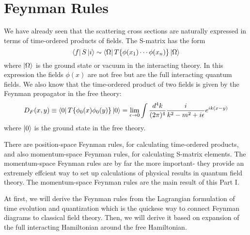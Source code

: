 \documentclass[12pt,openany]{book}
\begin{document}
	
	
	
	
	
	
	
	
	
	
	
	
	
	
	
	
	
	
	
	
	
	
	
	
	
	
	
	\chapter{Feynman Rules}
     We have already seen that the scattering cross sections are naturally expressed
     in terms of time-ordered products of fields. The S-matrix has the form
     \begin{equation}
     	\bra{f}S\ket{i}\sim \bra{\Omega}T\{\phi(x_1)\cdots\phi(x_n)\}\ket{\Omega}
     \end{equation}
     where $\ket{\Omega}$ is the ground state or vacuum in the interacting theory. 
     In this expression the fields $\phi(x)$ are not free but are the full interacting
     quantum fields. We also know that the time-ordered product of two fields is given by 
     the Feynman propagator in the free theory:
     \begin{equation}
     	D_F(x,y)\equiv\bra{0}T\{\phi_0(x)\phi_0(y)\}\ket{0}=\lim_{\epsilon\rightarrow0}\int\frac{d^4k}{(2\pi)^4}\frac{i}{k^2-m^2+i\epsilon}e^{ik(x-y)}
     \end{equation}
     where $\ket{0}$ is the ground state in the free theory.
     \par
     There are position-space Feynman rules, for calculating time-ordered products,
     and also momentum-space Feynman rules, for calculating S-matrix elements. 
     The momentum-space Feynman rules are by far the more important- they provide an
     extremely effcient way to set up calculations of physical results in quantum field
     theory. The momentum-space Feynman rules are the main result of this Part I.
     \par 
     At first, we will derive the Feynman rules from the Lagrangian formulation of time evolution and quantization which 
     is the quickese way to connect Feynman diagrams to classical field theory. Then, we will
     derive it based on expansion of the full interacting Hamiltonian around the free Hamiltonian.
     \par 
\end{document}
